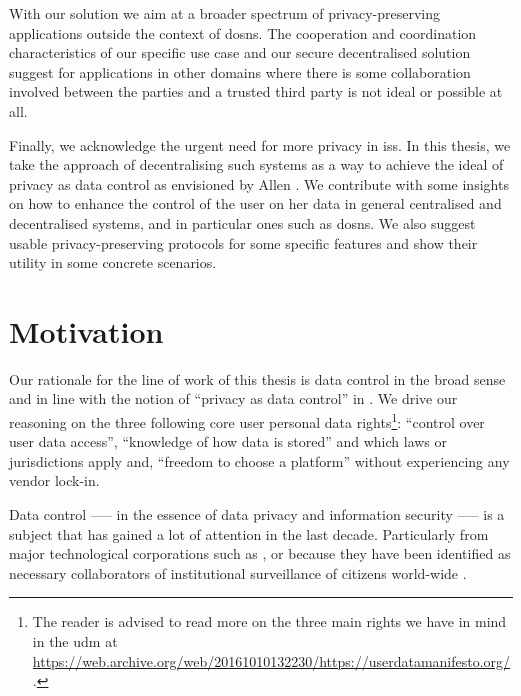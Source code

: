 \documentclass[showtrims, oldfontcommands]{kthesis}
\begin{document}
With our solution we aim at a broader spectrum of privacy-preserving applications 
outside the context of \acp{dosn}. The cooperation and coordination characteristics 
of our specific use case and our secure decentralised solution suggest for applications 
in other domains where there is some collaboration involved between the parties 
and a trusted third party is not ideal or possible at all.

Finally, we acknowledge the urgent need for more privacy in \acp{is}. 
In this thesis, we take the approach of decentralising such systems as a way to 
achieve the ideal of privacy as data control as envisioned by Allen \cite{Allen99}. 
We contribute with some insights on how to enhance the control of the user on her 
data in general centralised and decentralised systems, and in particular ones such 
as \acp{dosn}. We also suggest usable privacy-preserving protocols for some specific 
features and show their utility in some concrete scenarios.

\section{Motivation}
    \label{section:motivation}
Our rationale for the line of work of this thesis is data control in the broad sense 
and in line with the notion of ``privacy as data control'' in \cite{Allen99}. We 
drive our reasoning on the three following core user personal data rights\footnote{The 
reader is advised to read more on the three main rights we have in mind in the \Ac{udm} 
at \url{https://web.archive.org/web/20161010132230/https://userdatamanifesto.org/}.}: 
``control over user data access'', ``knowledge of how data is stored'' and which 
laws or jurisdictions apply and, ``freedom to choose a platform'' without experiencing 
any vendor lock-in.


Data control —-- in the essence of data privacy and information security —-- is a 
subject that has gained a lot of attention in the last decade. Particularly from 
major technological corporations such as \Google, \Apple or \Facebook because they 
have been identified as necessary collaborators of institutional surveillance of 
citizens world-wide \cite{Lyon14}.
\end{document}
